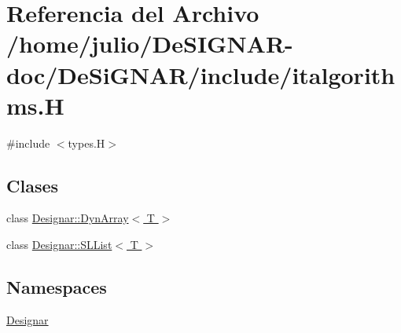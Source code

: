\hypertarget{italgorithms_8_h}{}\section{Referencia del Archivo /home/julio/\+De\+S\+I\+G\+N\+A\+R-\/doc/\+De\+Si\+G\+N\+A\+R/include/italgorithms.H}
\label{italgorithms_8_h}
{\ttfamily \#include $<$types.\+H$>$}\newline
\subsection*{Clases}
\begin{DoxyCompactItemize}
\item 
class \hyperlink{class_designar_1_1_dyn_array}{Designar\+::\+Dyn\+Array$<$ T $>$}
\item 
class \hyperlink{class_designar_1_1_s_l_list}{Designar\+::\+S\+L\+List$<$ T $>$}
\end{DoxyCompactItemize}
\subsection*{Namespaces}
\begin{DoxyCompactItemize}
\item 
 \hyperlink{namespace_designar}{Designar}
\end{DoxyCompactItemize}
